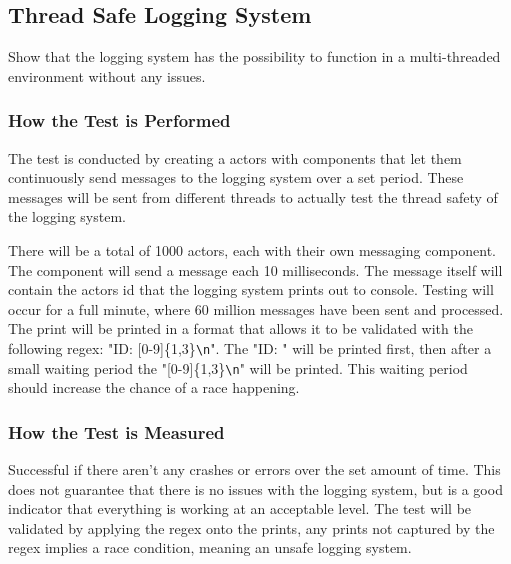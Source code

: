 \subsection{Thread Safe Logging System}
Show that the logging system has the possibility to function in a multi-threaded environment without any issues.

\subsubsection*{How the Test is Performed}
The test is conducted by creating a actors with components that let them continuously send messages to the logging system over a set period. These messages will be sent from different threads to actually test the thread safety of the logging system.

There will be a total of 1000 actors, each with their own messaging component.
The component will send a message each 10 milliseconds.
The message itself will contain the actors id that the logging system prints out to console.
Testing will occur for a full minute, where 60 million messages have been sent and processed.
The print will be printed in a format that allows it to be validated with the following regex: 
"ID: [0-9]\{1,3\}\verb!\n!".
The "ID: " will be printed first, then after a small waiting period the "[0-9]\{1,3\}\verb!\n!" will be printed.
This waiting period should increase the chance of a race happening.

\subsubsection*{How the Test is Measured}
Successful if there aren't any crashes or errors over the set amount of time. 
This does not guarantee that there is no issues with the logging system, but is a good indicator that everything is working at an acceptable level.
The test will be validated by applying the regex onto the prints, any prints not captured by the regex implies a race condition, meaning an unsafe logging system.
